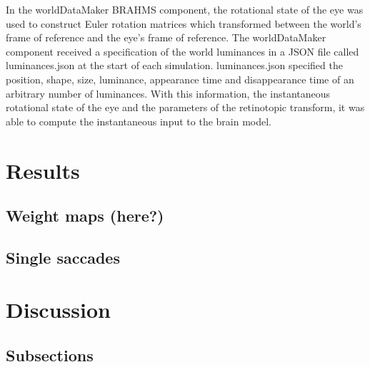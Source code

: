 \documentclass{frontiersSCNS}
\begin{document}
In the worldDataMaker BRAHMS component, the rotational state of the
eye was used to construct Euler rotation matrices which transformed
between the world's frame of reference and the eye's frame of
reference. The worldDataMaker component received a specification of
the world luminances in a JSON file called luminances.json at the
start of each simulation. luminances.json specified the position,
shape, size, luminance, appearance time and disappearance time of an
arbitrary number of luminances. With this information, the
instantaneous rotational state of the eye and the parameters of the
retinotopic transform, it was able to compute the instantaneous input
to the brain model.


\section{Results}

%

\subsection{Weight maps (here?)}

\subsection{Single saccades}

\section{Discussion}


\subsection{Subsections}

\end{document}
